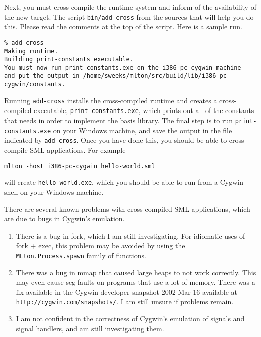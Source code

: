 Next, you must cross compile the {\mlton} runtime system and inform {\mlton} of
the availability of the new target.  The script {\tt bin/add-cross} from
the {\mlton} sources that will help you do this.  Please read the comments at
the top of the script.  Here is a sample run.
\begin{verbatim}
% add-cross
Making runtime.
Building print-constants executable.
You must now run print-constants.exe on the i386-pc-cygwin machine
and put the output in /home/sweeks/mlton/src/build/lib/i386-pc-cygwin/constants.
\end{verbatim}
Running {\tt add-cross} installs the cross-compiled runtime and creates a
cross-compiled executable, {\tt print-constants.exe}, which prints out all of
the constants that {\mlton} needs in order to implement the basis library.  The
final step is to run {\tt print-constants.exe} on your Windows machine, and save
the output in the file indicated by {\tt add-cross}.  Once you have done this,
you should be able to cross compile SML applications.  For example
\begin{verbatim}
mlton -host i386-pc-cygwin hello-world.sml
\end{verbatim}
will create {\tt hello-world.exe}, which you should be able to run from a Cygwin
shell on your Windows machine.


There are several known problems with cross-compiled SML applications, which are
due to bugs in Cygwin's emulation.

\begin{enumerate}

\item There is a bug in fork, which I am still investigating.  For idiomatic
uses of fork + exec, this problem may be avoided by using the {\tt
MLton.Process.spawn} family of functions. 

\item There was a bug in mmap that caused large heaps to not work correctly.
This may even cause seg faults on programs that use a lot of memory.  There was
a fix available in the Cygwin developer snapshot 2002-Mar-16 available at
{\tt http://cygwin.com/snapshots/}.  I am still unsure if problems remain.

\item I am not confident in the correctness of Cygwin's emulation of signals and
signal handlers, and am still investigating them.

\end{enumerate}
